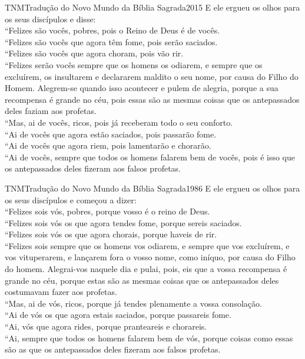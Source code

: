 \begin{traducao}{TNM}{Tradução do Novo Mundo da Bíblia Sagrada}{2015}
E ele ergueu os olhos para os seus discípulos e disse:\\
“Felizes são vocês, pobres, pois o Reino de Deus é de vocês.\\
“Felizes são vocês que agora têm fome, pois serão saciados.\\
“Felizes são vocês que agora choram, pois vão rir.\\
“Felizes serão vocês sempre que os homens os odiarem, e sempre que os
excluírem, os insultarem e declararem maldito o seu nome, por causa do Filho do
Homem. Alegrem-se quando isso acontecer e pulem de alegria, porque a sua
recompensa é grande no céu, pois essas são as mesmas coisas que os antepassados
deles faziam aos profetas.\\
“Mas, ai de vocês, ricos, pois já receberam todo o seu conforto.\\
“Ai de vocês que agora estão saciados, pois passarão fome.\\
“Ai de vocês que agora riem, pois lamentarão e chorarão.\\
“Ai de vocês, sempre que todos os homens falarem bem de vocês, pois é isso
que os antepassados deles fizeram aos falsos profetas.
\end{traducao}

\begin{traducao}{TNM}{Tradução do Novo Mundo da Bíblia Sagrada}{1986}
E ele ergueu os olhos para os seus discípulos e começou a dizer:\\
“Felizes sois vós, pobres, porque vosso é o reino de Deus.\\
“Felizes sois vós os que agora tendes fome, porque sereis saciados.\\
“Felizes sois vós os que agora chorais, porque haveis de rir.\\
“Felizes sois sempre que os homens vos odiarem, e sempre que vos
excluírem, e vos vituperarem, e lançarem fora o vosso nome, como iníquo, por
causa do Filho do homem. Alegrai-vos naquele dia e pulai, pois, eis que a
vossa recompensa é grande no céu, porque estas são as mesmas coisas que os
antepassados deles costumavam fazer aos profetas.\\
“Mas, ai de vós, ricos, porque já tendes plenamente a vossa consolação.\\
“Ai de vós os que agora estais saciados, porque passareis fome.\\
“Ai, vós que agora rides, porque pranteareis e chorareis.\\
“Ai, sempre que todos os homens falarem bem de vós, porque coisas como
essas são as que os antepassados deles fizeram aos falsos profetas.
\end{traducao}

